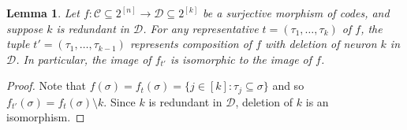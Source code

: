 \documentclass[11pt,letterpaper, reqno]{amsart}
\newtheorem{lem}[thm]{Lemma}         %
\theoremstyle{definition}
\def\cC{\mathcal{C}}
\def\cD{\mathcal{D}}
\begin{document}
            
        
        \begin{lem}\label{lem:redundancyinimage}
            Let $f: \cC \subseteq2^{[n]} \to \cD\subseteq2^{[k]}$ be a surjective morphism of codes, and suppose $k$ is redundant in $\cD$.
            For any representative $t = (\tau_1,\dots,\tau_k)$ of $f$, the tuple $t' = (\tau_1,\dots,\tau_{k-1})$ represents composition of $f$ with deletion of neuron $k$ in $\cD$.
            In particular, the image of $f_{t'}$ is isomorphic to the image of $f$.
        \end{lem}
        \begin{proof}
            Note that $f(\sigma) = f_t(\sigma) = \{j \in [k] : \tau_j \subseteq \sigma\}$ and so $f_{t'}(\sigma) = f_t(\sigma) \setminus k$. Since $k$ is redundant in $\cD$, deletion of $k$ is an isomorphism.
        \end{proof}
\end{document}
